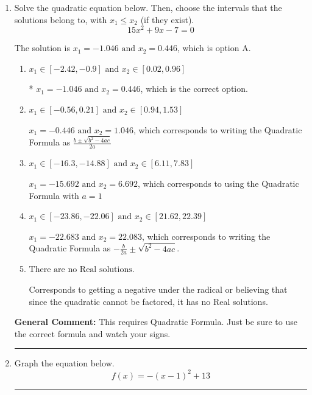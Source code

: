 \documentclass{extbook}[14pt]
\newcommand{\litem}[1]{\item #1

\rule{\textwidth}{0.4pt}}
\begin{document}
\begin{enumerate}\litem{
Solve the quadratic equation below. Then, choose the intervals that the solutions belong to, with $x_1 \leq x_2$ (if they exist).
\[ 15x^{2} +9 x -7 = 0 \]

The solution is \( x_1 = -1.046 \text{ and } x_2 = 0.446 \), which is option A.\begin{enumerate}[label=\Alph*.]
\item \( x_1 \in [-2.42, -0.9] \text{ and } x_2 \in [0.02, 0.96] \)

* $x_1 = -1.046 \text{ and } x_2 = 0.446$, which is the correct option.
\item \( x_1 \in [-0.56, 0.21] \text{ and } x_2 \in [0.94, 1.53] \)

 $x_1 = -0.446 \text{ and } x_2 = 1.046$, which corresponds to writing the Quadratic Formula as $\frac{b \pm \sqrt{b^2 - 4ac}}{2a}$
\item \( x_1 \in [-16.3, -14.88] \text{ and } x_2 \in [6.11, 7.83] \)

 $x_1 = -15.692 \text{ and } x_2 = 6.692$, which corresponds to using the Quadratic Formula with $a=1$
\item \( x_1 \in [-23.86, -22.06] \text{ and } x_2 \in [21.62, 22.39] \)

 $x_1 = -22.683 \text{ and } x_2 = 22.083$, which corresponds to writing the Quadratic Formula as $-\frac{b}{2a} \pm \sqrt{b^2 - 4ac}$.
\item \( \text{There are no Real solutions.} \)

Corresponds to getting a negative under the radical or believing that since the quadratic cannot be factored, it has no Real solutions.
\end{enumerate}

\textbf{General Comment:} This requires Quadratic Formula. Just be sure to use the correct formula and watch your signs.
}
\litem{
Graph the equation below.
\[ f(x) = -(x-1)^2 + 13 \]

}
\end{enumerate}
\end{document}
